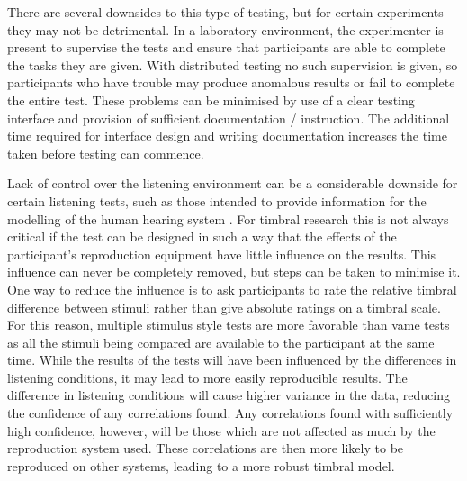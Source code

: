 			There are several downsides to this type of testing, but for certain experiments they may not be
			detrimental. In a laboratory environment, the experimenter is present to supervise the tests and
			ensure that participants are able to complete the tasks they are given.  With distributed testing
			no such supervision is given, so participants who have trouble may produce anomalous results or
			fail to complete the entire test. These problems can be minimised by use of a clear testing
			interface and provision of sufficient documentation / instruction. The additional time required for
			interface design and writing documentation increases the time taken before testing can commence.

			Lack of control over the listening environment can be a considerable downside for certain listening
			tests, such as those intended to provide information for the modelling of the human hearing system
			\citep{moore1990auditory}. For timbral research this is not always critical if the test can be
			designed in such a way that the effects of the participant's reproduction equipment have little
			influence on the results. This influence can never be completely removed, but steps can be taken to
			minimise it.  One way to reduce the influence is to ask participants to rate the relative timbral
			difference between stimuli rather than give absolute ratings on a timbral scale. For this reason,
			multiple stimulus style tests are more favorable than \acrshort{vame} tests as all the stimuli
			being compared are available to the participant at the same time. While the results of the tests
			will have been influenced by the differences in listening conditions, it may lead to more easily
			reproducible results. The difference in listening conditions will cause higher variance in the
			data, reducing the confidence of any correlations found. Any correlations found with sufficiently
			high confidence, however, will be those which are not affected as much by the reproduction system
			used.  These correlations are then more likely to be reproduced on other systems, leading to a more
			robust timbral model.

